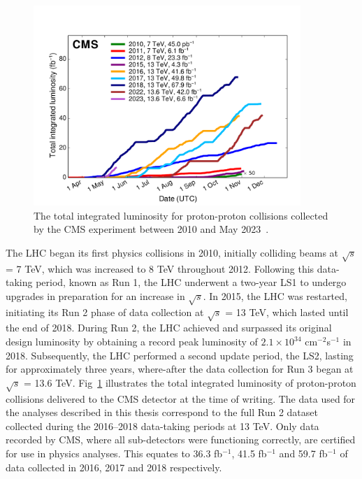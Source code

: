 \begin{figure}[h]
    \centering
    \includegraphics[width=0.9\textwidth]{Figures/int_lumi_cumulative_pp_2.pdf}
    \caption{The total integrated luminosity for proton-proton collisions collected by the \ac{CMS} experiment between 2010 and May 2023~\cite{lumi}.}
    \label{fig:int_lumi}
\end{figure}

The \ac{LHC} began its first physics collisions in 2010, initially colliding beams at $\sqrt{s}$ = 7 TeV, which was increased to 8 TeV throughout 2012. 
Following this data-taking period, known as Run 1, the \ac{LHC} underwent a two-year \ac{LS1} to undergo upgrades in preparation for an increase in $\sqrt{s}$. 
In 2015, the \ac{LHC} was restarted, initiating its Run 2 phase of data collection at $\sqrt{s}$ = 13 TeV, which lasted until the end of 2018. 
During Run 2, the \ac{LHC} achieved and surpassed its original design luminosity by obtaining a record peak luminosity of $2.1\times10^{34}$ cm$^{−2}$s$^{−1}$ in 2018.
Subsequently, the \ac{LHC} performed a second update period, the \ac{LS2}, lasting for approximately three years, where-after the data collection for Run 3 began at $\sqrt{s}$ = 13.6 TeV.
Fig~\ref{fig:int_lumi} illustrates the total integrated luminosity of proton-proton collisions delivered to the \ac{CMS} detector at the time of writing.
The data used for the analyses described in this thesis correspond to the full Run 2 dataset collected during the 2016--2018 data-taking periods at 13 TeV. 
Only data recorded by \ac{CMS}, where all sub-detectors were functioning correctly, are certified for use in physics analyses. 
This equates to 36.3 fb$^{−1}$, 41.5 fb$^{−1}$ and 59.7 fb$^{-1}$ of data collected in 2016, 2017 and 2018 respectively. \\

